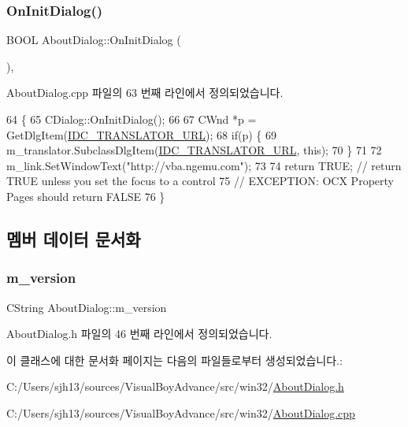 \subsubsection{\texorpdfstring{On\+Init\+Dialog()}{OnInitDialog()}}
{\footnotesize\ttfamily B\+O\+OL About\+Dialog\+::\+On\+Init\+Dialog (\begin{DoxyParamCaption}{ }\end{DoxyParamCaption})\hspace{0.3cm}{\ttfamily [protected]}, {\ttfamily [virtual]}}



About\+Dialog.\+cpp 파일의 63 번째 라인에서 정의되었습니다.


\begin{DoxyCode}
64 \{
65   CDialog::OnInitDialog();
66   
67   CWnd *p = GetDlgItem(\mbox{\hyperlink{resource_8h_a5b3a02ffc3f0b3215cd7b04e16df69b1}{IDC\_TRANSLATOR\_URL}});
68   \textcolor{keywordflow}{if}(p) \{
69     m\_translator.SubclassDlgItem(\mbox{\hyperlink{resource_8h_a5b3a02ffc3f0b3215cd7b04e16df69b1}{IDC\_TRANSLATOR\_URL}}, \textcolor{keyword}{this});
70   \}
71 
72   m\_link.SetWindowText(\textcolor{stringliteral}{"http://vba.ngemu.com"});
73 
74   \textcolor{keywordflow}{return} TRUE;  \textcolor{comment}{// return TRUE unless you set the focus to a control}
75   \textcolor{comment}{// EXCEPTION: OCX Property Pages should return FALSE}
76 \}
\end{DoxyCode}


\subsection{멤버 데이터 문서화}
\mbox{\label{class_about_dialog_a78e658a0c2d03632ce86a675b89d8492}} 
\subsubsection{\texorpdfstring{m\+\_\+version}{m\_version}}
{\footnotesize\ttfamily C\+String About\+Dialog\+::m\+\_\+version}



About\+Dialog.\+h 파일의 46 번째 라인에서 정의되었습니다.



이 클래스에 대한 문서화 페이지는 다음의 파일들로부터 생성되었습니다.\+:\begin{DoxyCompactItemize}
\item 
C\+:/\+Users/sjh13/sources/\+Visual\+Boy\+Advance/src/win32/\mbox{\hyperlink{_about_dialog_8h}{About\+Dialog.\+h}}\item 
C\+:/\+Users/sjh13/sources/\+Visual\+Boy\+Advance/src/win32/\mbox{\hyperlink{_about_dialog_8cpp}{About\+Dialog.\+cpp}}\end{DoxyCompactItemize}
